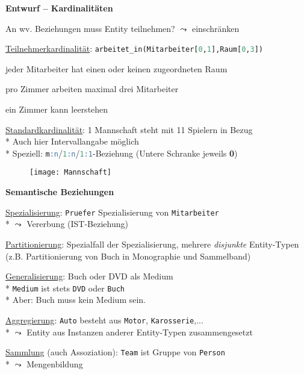 \textbf{Entwurf -- Kardinalitäten}
\begin{items}
	\item An wv. Beziehungen muss Entity teilnehmen? \( \leadsto \) einschränken
	\item \underline{Teilnehmerkardinalität}: \lstinline[language=sql]{arbeitet_in(Mitarbeiter[0,1],Raum[0,3])}
	\begin{enumeration}
	 	\item jeder Mitarbeiter hat einen oder keinen zugeordneten Raum
	 	\item pro Zimmer arbeiten maximal drei Mitarbeiter
	 	\item ein Zimmer kann leerstehen
	 \end{enumeration} 
	 \item \underline{Standardkardinalität}: 1 Mannschaft steht mit 11 Spielern in Bezug \\*
	 Auch hier Intervallangabe möglich\\*
	  Speziell: \lstinline[language=sql]{m:n}/\lstinline[language=sql]{1:n}/\lstinline[language=sql]{1:1}-Beziehung (Untere Schranke jeweils \textbf{0})
	 \begin{figure}[H]\centering\label{Mannschaft}\texttt{[image: Mannschaft]}\end{figure}
\end{items}



\newpage

\textbf{Semantische Beziehungen}
\begin{items}
	\item \underline{Spezialisierung}: \lstinline[language=sql]{Pruefer} Spezialisierung von \lstinline[language=sql]{Mitarbeiter} \\* \( \leadsto \) Vererbung (IST-Beziehung)
	\item \underline{Partitionierung}: Spezialfall der Spezialisierung, mehrere \emph{disjunkte} Entity-Typen (z.B. Partitionierung von Buch in Monographie und Sammelband)
	\item \underline{Generalisierung}: Buch oder DVD als Medium \\*
	\lstinline[language=sql]{Medium} ist stets \lstinline[language=sql]{DVD} oder \lstinline[language=sql]{Buch} \\* Aber: Buch muss kein Medium sein.
	\item \underline{Aggregierung}: \lstinline[language=sql]{Auto} besteht aus \lstinline[language=sql]{Motor}, \lstinline[language=sql]{Karosserie},... \\* \( \leadsto \) Entity aus Instanzen anderer Entity-Typen zusammengesetzt
	\item \underline{Sammlung} (auch Assoziation): \lstinline[language=sql]{Team} ist Gruppe von \lstinline[language=sql]{Person} \\* \( \leadsto \) Mengenbildung
\end{items}

